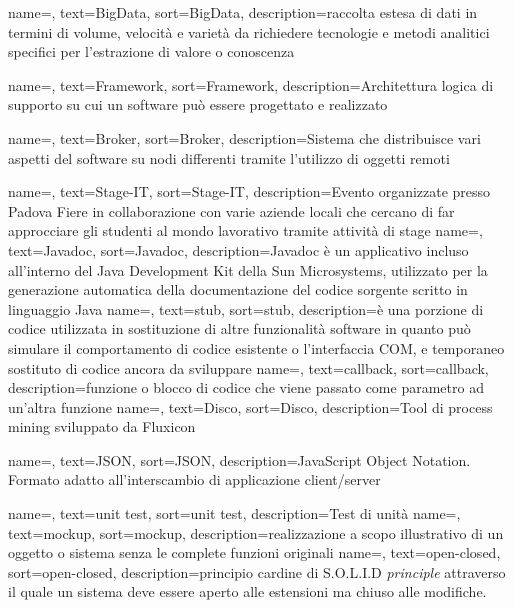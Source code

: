 {
    name=,
    text=BigData,
    sort=BigData,
    description={raccolta estesa di dati in termini di volume, velocità e varietà da richiedere tecnologie e metodi analitici specifici per l'estrazione di valore o conoscenza}
}

{
    name=,
    text=Framework,
    sort=Framework,
    description={Architettura logica di supporto su cui un software può essere progettato e realizzato}
}

{
    name=,
    text=Broker,
    sort=Broker,
    description={Sistema che distribuisce vari aspetti del software su nodi differenti tramite l'utilizzo di oggetti remoti}
}

{
    name=,
    text=Stage-IT,
    sort=Stage-IT,
    description={Evento organizzate presso Padova Fiere in collaborazione con varie aziende locali che cercano di far approcciare gli studenti al mondo lavorativo tramite attività di stage}
}
{
    name=,
    text=Javadoc,
    sort=Javadoc,
    description={Javadoc è un applicativo incluso all'interno del Java Development Kit della Sun Microsystems, utilizzato per la generazione automatica della documentazione del codice sorgente scritto in linguaggio Java}
}
{
    name=,
    text=stub,
    sort=stub,
    description={è una porzione di codice utilizzata in sostituzione di altre funzionalità software in quanto può simulare il comportamento di codice esistente o l'interfaccia COM, e temporaneo sostituto di codice ancora da sviluppare}
}
{
    name=,
    text=callback,
    sort=callback,
    description={funzione o blocco di codice che viene passato come parametro ad un'altra funzione}
}
{
    name=,
    text=Disco,
    sort=Disco,
    description={Tool di process mining sviluppato da Fluxicon}
}

{
    name=,
    text=JSON,
    sort=JSON,
    description={JavaScript Object Notation. Formato adatto all'interscambio di applicazione client/server}
}

{
    name=,
    text=unit test,
    sort=unit test,
    description={Test di unità}
}
{
    name=,
    text=mockup,
    sort=mockup,
    description={realizzazione a scopo illustrativo di un oggetto o sistema senza le complete funzioni originali}
}
{
    name=,
    text=open-closed,
    sort=open-closed,
    description={principio cardine di S.O.L.I.D \textit{principle} attraverso il quale un sistema deve essere aperto alle estensioni ma chiuso alle modifiche.}
}